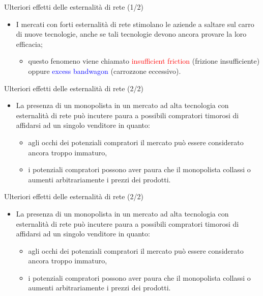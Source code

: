 \documentclass{beamer}
\begin{document}
\begin{frame}
{\centerline{Ulteriori effetti delle esternalit\`{a} di rete (1/2)}}

\begin{itemize}
\item I mercati con forti esternalit\`{a} di rete stimolano le aziende a saltare sul carro di nuove tecnologie, anche se tali tecnologie devono ancora provare la loro efficacia;
\begin{itemize}
\item questo fenomeno viene chiamato \textcolor{red}{insufficient friction} (frizione insufficiente) oppure \textcolor{blue}{excess bandwagon} (carrozzone eccessivo).
\end{itemize}


\end{itemize}

\end{frame}

\begin{frame}
{\centerline{Ulteriori effetti delle esternalit\`{a} di rete (2/2)}}

\begin{itemize}

\item La presenza di un monopolista in un mercato ad alta tecnologia con esternalit\`{a} di rete pu\`{o} incutere paura a possibili compratori timorosi di affidarsi ad un singolo venditore in quanto:
\begin{itemize}
\item agli occhi dei potenziali compratori il mercato pu\`{o} essere considerato ancora troppo immaturo,
\item i potenziali compratori possono aver paura che il monopolista collassi o aumenti arbitrariamente i prezzi dei prodotti.
\end{itemize}

\end{itemize}

\end{frame}

\begin{frame}
{\centerline{Ulteriori effetti delle esternalit\`{a} di rete (2/2)}}

\begin{itemize}

\item La presenza di un monopolista in un mercato ad alta tecnologia con esternalit\`{a} di rete pu\`{o} incutere paura a possibili compratori timorosi di affidarsi ad un singolo venditore in quanto:
\begin{itemize}
\item agli occhi dei potenziali compratori il mercato pu\`{o} essere considerato ancora troppo immaturo,
\item i potenziali compratori possono aver paura che il monopolista collassi o aumenti arbitrariamente i prezzi dei prodotti.
\end{itemize}

\end{itemize}

\end{frame}
\end{document}
